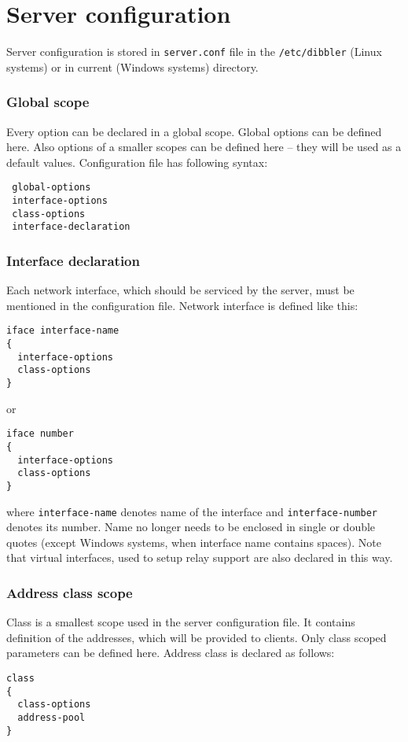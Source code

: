 
\newpage
\section{Server configuration}
\label{server-conf}
Server configuration is stored in \verb+server.conf+ file in the
\verb+/etc/dibbler+ (Linux systems) or in current (Windows systems)
directory.

\subsubsection{Global scope}
\label{server-global-scope}
Every option can be declared in a global scope. Global options can be
defined here. Also options of a smaller scopes can be defined here --
they will be used as a default values. Configuration file has following syntax:

\begin{lstlisting}
 global-options
 interface-options
 class-options
 interface-declaration
\end{lstlisting}

\subsubsection{Interface declaration}
\label{server-iface-scope}
Each network interface, which should be serviced by the server, must be
mentioned in the configuration file. Network interface is defined like this:
\begin{lstlisting}
iface interface-name
{
  interface-options
  class-options
}
\end{lstlisting}

or

\begin{lstlisting}
iface number
{
  interface-options
  class-options
}
\end{lstlisting}

where \verb+interface-name+ denotes name of the interface and
\verb+interface-number+ denotes its number. Name no longer needs to be
enclosed in single or double quotes (except Windows systems, when
interface name contains spaces). Note that virtual interfaces, used
to setup relay support are also declared in this way.

\subsubsection{Address class scope}
\label{server-class-scope}
Class is a smallest scope used in the server configuration file. It
contains definition of the addresses, which will be provided to
clients. Only class scoped parameters can be defined here. Address class
is declared as follows:
\begin{lstlisting}
class
{
  class-options
  address-pool
}
\end{lstlisting}

